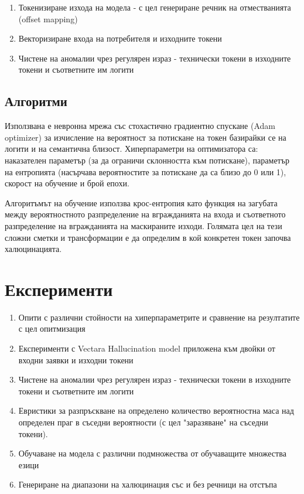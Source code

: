 \documentclass[12pt]{article}
\begin{document}
		\begin{enumerate}    
			\item[\textbullet] Токенизиране  изхода на модела - с цел генериране речник на отместванията (offset mapping)
			\item[\textbullet] Векторизиране входа на потребителя и изходните токени
			\item[\textbullet] Чистене на аномалии чрез регулярен израз - технически токени в изходните токени и съответните им логити
			\end{enumerate}
	
	\subsection{Алгоритми} 
	
	Използвана е невронна мрежа със стохастично градиентно спускане (Adam optimizer) за изчисление на вероятност за потискане на токен базирайки се на логити и на семантична близост. Хиперпараметри на оптимизатора са: наказателен параметър (за да ограничи склонността към потискане), параметър на ентропията (насърчава вероятностите за потискане да са близо до 0 или 1), скорост на обучение и брой епохи.
	
	Алгоритъмът на обучение използва крос-ентропия като функция на загубата между вероятностното разпределение на вгражданията на входа и съответното разпределение на вгражданията на  маскираните изходи. 
	Голямата цел на тези сложни сметки и трансформации е да определим в кой конкретен токен започва халюцинацията.
	\section{Експерименти}
	
	\begin{enumerate}    
		\item[\textbullet] Опити с  различни стойности на хиперпараметрите и сравнение на резултатите с цел опитмизация
		\item[\textbullet] Експерименти с Vectara Hallucination model приложена към двойки от входни заявки и изходни токени
		\item[\textbullet] Чистене на аномалии чрез регулярен израз - технически токени в изходните токени и съответните им логити
	    \item[\textbullet] Евристики за разпръскване на определено количество вероятностна маса над определен праг в съседни вероятности (с цел "заразяване" на съседни токени).
	     \item[\textbullet] Обучаване на модела с различни подмножества от обучаващите множества езици
	     \item[\textbullet] Генериране на диапазони на халюцинация със и без речници на отстъпа
	\end{enumerate}
	
\end{document}
